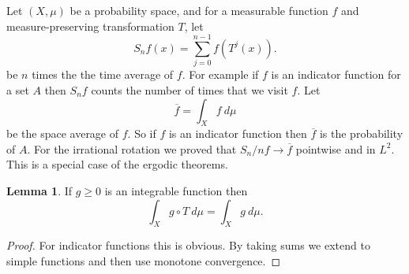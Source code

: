 \documentclass[12pt]{report}
\theoremstyle{definition}
\newtheorem{lemma}[theorem]{Lemma}
\begin{document}
Let $(X, \mu)$ be a probability space, and for a measurable function $f$ and measure-preserving transformation $T$, let
$$S_nf(x) = \sum_{j=0}^{n-1} f(T^j(x)).$$
be $n$ times the the time average of $f$. For example if $f$ is an indicator function for a set $A$ then $S_nf$ counts the number of times that we visit $f$. Let
$$\overline f = \int_X f ~d\mu$$
be the space average of $f$. So if $f$ is an indicator function then $\overline f$ is the probability of $A$. For the irrational rotation we proved that $S_n/nf \to \overline f$ pointwise and in $L^2$. This is a special case of the ergodic theorems.

\begin{lemma}
If $g \geq 0$ is an integrable function then
$$\int_X g\circ T ~d\mu = \int_X g~d\mu.$$
\end{lemma}
\begin{proof}
For indicator functions this is obvious. By taking sums we extend to simple functions and then use monotone convergence.
\end{proof}
\end{document}
